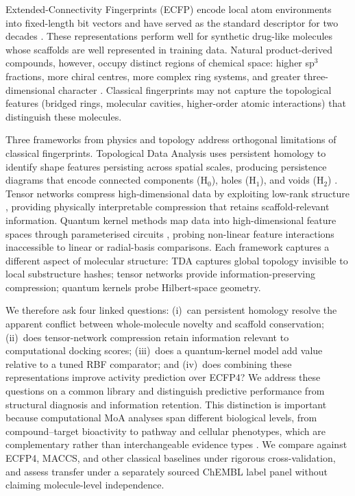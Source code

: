 \documentclass[pdflatex,sn-mathphys-num]{sn-jnl}%
\begin{document}
Extended-Connectivity Fingerprints (ECFP) encode local atom environments into fixed-length bit vectors and have served as the standard descriptor for two decades \cite{ecfp_2010}. These representations perform well for synthetic drug-like molecules whose scaffolds are well represented in training data. Natural product-derived compounds, however, occupy distinct regions of chemical space: higher sp$^3$ fractions, more chiral centres, more complex ring systems, and greater three-dimensional character \cite{coconut_2021}. Classical fingerprints may not capture the topological features (bridged rings, molecular cavities, higher-order atomic interactions) that distinguish these molecules.

Three frameworks from physics and topology address orthogonal limitations of classical fingerprints. Topological Data Analysis uses persistent homology to identify shape features persisting across spatial scales, producing persistence diagrams that encode connected components (H$_0$), holes (H$_1$), and voids (H$_2$) \cite{tda_review_2025,tda_binding_affinity_2026,tda_pretraining_2026}. Tensor networks compress high-dimensional data by exploiting low-rank structure \cite{tensornet_2023,tn_efficient_2026}, providing physically interpretable compression that retains scaffold-relevant information. Quantum kernel methods map data into high-dimensional feature spaces through parameterised circuits \cite{qml_review_2026,pqc_chemistry_2026}, probing non-linear feature interactions inaccessible to linear or radial-basis comparisons. Each framework captures a different aspect of molecular structure: TDA captures global topology invisible to local substructure hashes; tensor networks provide information-preserving compression; quantum kernels probe Hilbert-space geometry.

We therefore ask four linked questions: (i)~can persistent homology resolve the apparent conflict between whole-molecule novelty and scaffold conservation; (ii)~does tensor-network compression retain information relevant to computational docking scores; (iii)~does a quantum-kernel model add value relative to a tuned RBF comparator; and (iv)~does combining these representations improve activity prediction over ECFP4? We address these questions on a common library and distinguish predictive performance from structural diagnosis and information retention. This distinction is important because computational MoA analyses span different biological levels, from compound--target bioactivity to pathway and cellular phenotypes, which are complementary rather than interchangeable evidence types \cite{Trapotsi2022MoA}. We compare against ECFP4, MACCS, and other classical baselines under rigorous cross-validation, and assess transfer under a separately sourced ChEMBL label panel without claiming molecule-level independence.
\end{document}
